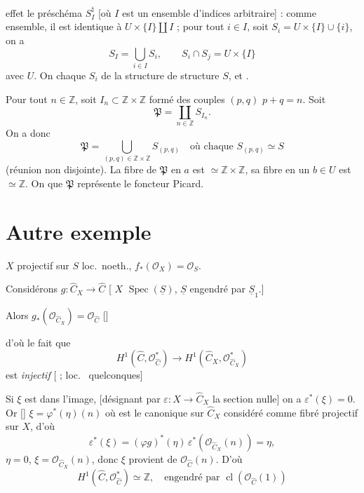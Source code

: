 \documentclass[11pt,a4paper]{article}
\begin{document}
 effet le préschéma \struck{\ill{}} $S^{\natural}_I$  [où $I$ est un ensemble d'indices arbitraire] : comme ensemble, il est identique à \struck{\ill{}} $U \times \{I\} \amalg I$ ; pour tout $i \in I$, soit $S_i = U \times \{I\} \cup \{i\}$,  on a
\[
  S_I = \bigcup_{i \in I} S_i , \qquad S_i \cap S_j = U \times \{I\}
\]
\ill{}   avec $U$. On  chaque $S_i$ de la structure   \ill{} \ill{} \ill{} \ill{} \ill{} de structure \ill{} \ill{} $S$, et \ill{} .

Pour tout $n \in \mathbb{Z}$, soit $I_n \subset \mathbb{Z} \times \mathbb{Z}$ formé des couples $(p, q)$  $p + q = n$. Soit
\[
  \mathfrak{P} = \coprod_{n \in \mathbb{Z}} S_{I_n} .
\]
On a donc
\[
  \mathfrak{P} = \bigcup_{(p, q) \in \mathbb{Z} \times \mathbb{Z}} S_{(p,q)}
  \quad \text{où chaque } S_{(p,q)} \simeq S
\]
(réunion non disjointe). La fibre de $\mathfrak{P}$ en $a$ est $\simeq \mathbb{Z} \times \mathbb{Z}$, sa fibre en un $b \in U$ est $\simeq \mathbb{Z}$. On  que $\mathfrak{P}$ représente le foncteur Picard.

\section{Autre exemple}

$X$ projectif sur $S$ loc.\ noeth., $f_*(\mathcal{O}_X) = \mathcal{O}_S$.

Considérons $g : \hat{C}_X \to \hat{C}$ [\ill{}  $X$ \ill{} \ill{} \ill{} \ill{} $\operatorname{Spec}(\underline{S})$, $\underline{S}$ engendré par $\underline{S}_1$.]

Alors $g_*(\mathcal{O}_{\hat{C}_X}) = \mathcal{O}_{\hat{C}}$ []

d'où le fait que
\[
  H^1(\hat{C}, \mathcal{O}^*_{\hat{C}}) \to H^1(\hat{C}_X, \mathcal{O}^*_{\hat{C}_X})
\]
est \emph{injectif} [ ; \ill{} \struck{\ill{}} loc.\  quelconques]

Si \struck{\ill{}} $\xi$ est dans l'image, \ill{} [désignant par $\varepsilon : X \to \hat{C}_X$ la section nulle] \ill{} on a $\varepsilon^*(\xi) = 0$. Or [] $\xi = \varphi^*(\eta)(n)$ où
\ill{} est le  canonique sur $\hat{C}_X$ considéré comme fibré projectif sur $X$, d'où
\[
  \varepsilon^*(\xi) = (\varphi g)^*(\eta) \, \varepsilon^*(\mathcal{O}_{\hat{C}_X}(n)) = \eta ,
\]
 \ill{} $\eta = 0$,  $\xi = \mathcal{O}_{\hat{C}_X}(n)$, donc $\xi$ provient de $\mathcal{O}_{\hat{C}}(n)$. D'où
\[
  \boxed{H^1(\hat{C}, \mathcal{O}^*_{\hat{C}}) \simeq \mathbb{Z}, \quad \text{engendré par } \operatorname{cl}(\mathcal{O}_{\hat{C}}(1))}
\]
\end{document}
